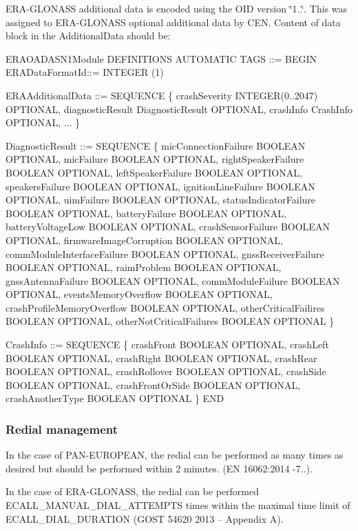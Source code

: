 E\+R\+A-\/\+G\+L\+O\+N\+A\+S\+S additional data is encoded using the O\+I\+D version \char`\"{}1..\char`\"{}. This was assigned to E\+R\+A-\/\+G\+L\+O\+N\+A\+S\+S optional additional data by C\+E\+N. Content of data block in the Additional\+Data should be\+:


\begin{DoxyCode}
ERAOADASN1Module
DEFINITIONS
AUTOMATIC TAGS ::=
BEGIN
ERADataFormatId::= INTEGER (1)

ERAAdditionalData ::= SEQUENCE \{
   crashSeverity INTEGER(0..2047) OPTIONAL,
   diagnosticResult DiagnosticResult OPTIONAL,
   crashInfo CrashInfo OPTIONAL,
   ...
\}

DiagnosticResult ::= SEQUENCE \{
   micConnectionFailure BOOLEAN OPTIONAL,
   micFailure BOOLEAN OPTIONAL,
   rightSpeakerFailure BOOLEAN OPTIONAL,
   leftSpeakerFailure BOOLEAN OPTIONAL,
   speakersFailure BOOLEAN OPTIONAL,
   ignitionLineFailure BOOLEAN OPTIONAL,
   uimFailure BOOLEAN OPTIONAL,
   statusIndicatorFailure BOOLEAN OPTIONAL,
   batteryFailure BOOLEAN OPTIONAL,
   batteryVoltageLow BOOLEAN OPTIONAL,
   crashSensorFailure BOOLEAN OPTIONAL,
   firmwareImageCorruption BOOLEAN OPTIONAL,
   commModuleInterfaceFailure BOOLEAN OPTIONAL,
   gnssReceiverFailure BOOLEAN OPTIONAL,
   raimProblem BOOLEAN OPTIONAL,
   gnssAntennaFailure BOOLEAN OPTIONAL,
   commModuleFailure BOOLEAN OPTIONAL,
   eventsMemoryOverflow BOOLEAN OPTIONAL,
   crashProfileMemoryOverflow BOOLEAN OPTIONAL,
   otherCriticalFailires BOOLEAN OPTIONAL,
   otherNotCriticalFailures BOOLEAN OPTIONAL
\}

CrashInfo ::= SEQUENCE \{
   crashFront BOOLEAN OPTIONAL,
   crashLeft BOOLEAN OPTIONAL,
   crashRight BOOLEAN OPTIONAL,
   crashRear BOOLEAN OPTIONAL,
   crashRollover BOOLEAN OPTIONAL,
   crashSide BOOLEAN OPTIONAL,
   crashFrontOrSide BOOLEAN OPTIONAL,
   crashAnotherType BOOLEAN OPTIONAL
\}
END
\end{DoxyCode}
\hypertarget{c_ecall_le_ecall_redial}{}\subsubsection{Redial management}\label{c_ecall_le_ecall_redial}
In the case of P\+A\+N-\/\+E\+U\+R\+O\+P\+E\+A\+N, the redial can be performed as many times as desired but should be performed within 2 minutes. (E\+N 16062\+:2014 -\/7..).

In the case of E\+R\+A-\/\+G\+L\+O\+N\+A\+S\+S, the redial can be performed E\+C\+A\+L\+L\+\_\+\+M\+A\+N\+U\+A\+L\+\_\+\+D\+I\+A\+L\+\_\+\+A\+T\+T\+E\+M\+P\+T\+S times within the maximal time limit of E\+C\+A\+L\+L\+\_\+\+D\+I\+A\+L\+\_\+\+D\+U\+R\+A\+T\+I\+O\+N (G\+O\+S\+T 54620 2013 – Appendix A).

